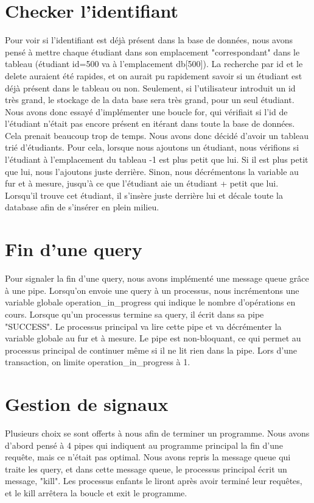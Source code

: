\documentclass[utf8]{article}
\begin{document}
\section{Checker l'identifiant}
\indent{}
\par
Pour voir si l'identifiant est déjà présent dans la base de données, nous avons pensé à mettre chaque étudiant
dans son emplacement "correspondant" dans le tableau (étudiant id=500 va à l'emplacement db[500]). La recherche par id et le delete auraient été rapides, et on 
aurait pu rapidement savoir si un étudiant est déjà présent dans le tableau ou non.
Seulement, si l'utilisateur introduit un id très grand, le stockage de la data base sera très grand, pour un seul étudiant.
Nous avons donc essayé d'implémenter une boucle for, qui vérifiait si l'id de l'étudiant n'était pas encore présent en itérant dans toute la base de données.
Cela prenait beaucoup trop de temps. Nous avons donc décidé d'avoir un tableau trié d'étudiants. Pour cela, lorsque nous ajoutons un étudiant,
nous vérifions si l'étudiant à l'emplacement du tableau -1 est plus petit que lui. Si il est plus petit que lui, nous l'ajoutons juste derrière. Sinon, 
nous décrémentons la variable au fur et à mesure, jusqu'à ce que l'étudiant aie un étudiant + petit que lui. Lorsqu'il trouve cet étudiant, il s'insère juste derrière lui
et décale toute la database afin de s'insérer en plein milieu.
\par
\section{Fin d'une query}
\indent{}
\par
Pour signaler la fin d'une query, nous avons implémenté une message queue grâce à une pipe. Lorsqu'on envoie 
une query à un processus, nous incrémentons une variable globale operation_in_progress qui indique le nombre d'opérations en cours.
Lorsque qu'un processus termine sa query, il écrit dans sa pipe "SUCCESS". Le processus principal va lire cette pipe et va décrémenter
la variable globale au fur et à mesure. Le pipe est non-bloquant, ce qui permet au processus principal de continuer
même si il ne lit rien dans la pipe. Lors d'une transaction, on limite operation_in_progress à 1.

\section{Gestion de signaux}
\indent{}
\par
Plusieurs choix se sont offerts à nous afin de terminer un programme. Nous avons d'abord pensé à 4 pipes qui indiquent au programme principal 
la fin d'une requête, mais ce n'était pas optimal.
Nous avons repris la message queue qui traite les query, et dans 
cette message queue, le processus principal écrit un message, "kill". Les processus enfants le liront après avoir terminé leur requêtes,
et le kill arrêtera la boucle et exit le programme.
\end{document}
